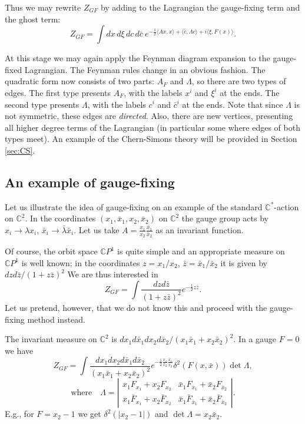 \documentclass[10pt]{amsart}
\theoremstyle{definition}
\theoremstyle{remark}
\newcommand{\C}{\mathbb C}
\def\<{\langle}
\def\>{\rangle}
\newcommand{\bx}{\bar{x}}
\newcommand{\Gd}{\delta}
\newcommand{\Gl}{\lambda}
\newcommand{\GL}{\Lambda}
\begin{document}
Thus we may rewrite $Z_{GF}$ by adding to the Lagrangian the
gauge-fixing term and the ghost term:
$$
Z_{GF}=\int dx\, d\xi\, dc\, d\bar{c}\ e^{-\frac12\<Ax,x\>+
\<\bar{c},\GL c\>+i\<\xi,F(x)\>} .
$$

At this stage we may again apply the Feynman diagram expansion to
the gauge-fixed Lagrangian. The Feynman rules change in an obvious
fashion. The quadratic form now consists of two parts: $A_F$ and
$\GL$, so there are two types of edges. The first type presents
$A_F$, with the labels $x^i$ and $\xi^i$ at the ends. The second
type presents $\GL$, with the labels $c^i$ and $\bar{c}^i$ at the
ends. Note that since $\GL$ is not symmetric, these edges are {\em
directed}. Also, there are new vertices, presenting all higher
degree terms of the Lagrangian (in particular some where edges of
both types meet).
An example of the Chern-Simons theory will be provided in Section
\ref{sec:CS}.

\subsection{An example of gauge-fixing}\label{ex:CP1}
Let us illustrate the idea of gauge-fixing on an example of the
standard $\C^*$-action on $\C^2$. In the coordinates
$(x_1,\bx_1,x_2,\bx_2)$ on $\C^2$ the gauge group acts by
$x_i\to\Gl x_i$, $\bx_i\to\bar{\Gl}\bx_i$. Let us take
$A=\frac{x_1}{x_2}\frac{\bx_1}{\bx_2}$ as an invariant
function.

Of course, the orbit space $\C P^1$ is quite simple and an
appropriate measure on $\C P^1$ is well known; in the coordinates
$z=x_1/x_2$, $\bar{z}=\bx_1/\bx_2$ it is given by $dz
d\bar{z}/(1+z\bar{z})^2$ We are thus interested in
\begin{equation}
\label{eq:direct} Z_{GF}=\int\frac{dz d\bar{z}}{(1+z\bar{z})^2}
e^{-\frac12 z\bar{z}} .
\end{equation}
Let us pretend, however, that we do not know this and proceed with
the gauge-fixing method instead.

The invariant measure on $\C^2$ is $dx_1 d\bx_1 dx_2
d\bx_2/(x_1\bx_1+x_2\bx_2)^2$. In a gauge $F=0$ we have
$$
 Z_{GF}=\int\frac{dx_1 dx_2 d\bx_1 d\bx_2}{(x_1\bx_1+x_2\bx_2)^2}
 e^{-\frac12\frac{x_1}{x_2}\frac{\bx_1}{\bx_2}}\Gd^2(F(x,\bx))
\det \GL ,$$ $$\text{where}\quad \GL=\left|\begin{array}{cc}
x_1F_{x_1}+x_2F_{x_2}&\bx_1F_{\bx_1}+\bx_2F_{\bx_2}\\
x_1\bar{F}_{x_1}+x_2\bar{F}_{x_2}&\bx_1\bar{F}_{\bx_1}+
\bx_2\bar{F}_{\bx_2}\end{array}\right|.$$ E.g., for $F=x_2-1$ we
get $\Gd^2(|x_2-1|)$ and $\det \GL =x_2\bx_2$.
\end{document}
